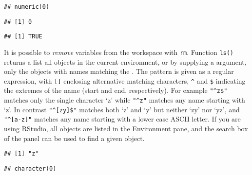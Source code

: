 \documentclass[paper=a4,10pt,div=17,headsepline,BCOR=12mm,twoside,open=right]{scrbook}\usepackage{knitr}
\begin{document}
\begin{knitrout}\footnotesize
{}\color{fgcolor}\begin{kframe}
\begin{alltt}
 \hlkwb{<-} \hlstd{(}\hlstd{)}
\end{alltt}
\begin{verbatim}
## numeric(0)
\end{verbatim}
\begin{alltt}
\end{alltt}
\begin{verbatim}
## [1] 0
\end{verbatim}
\begin{alltt}
\end{alltt}
\begin{verbatim}
## [1] TRUE
\end{verbatim}
\end{kframe}
\end{knitrout}

It is possible to \emph{remove} variables from the workspace with \texttt{rm}. Function \texttt{ls()} returns a list all objects in the current environment, or by supplying a  argument, only the objects with names matching the . The pattern is given as a regular expression, with \verb|[]| enclosing alternative matching characters, \verb|^| and \verb|$| indicating the extremes of the name (start and end, respectively). For example \verb|"^z$"| matches only the single character `z' while \verb|"^z"| matches any name starting with `z'. In contrast \verb|"^[zy]$"| matches both `z' and `y' but neither `zy' nor `yz', and \verb|"^[a-z]"| matches any name starting with a lower case ASCII letter. If you are using RStudio, all objects are listed in the Environment pane, and the search box of the panel can be used to find a given object.

\begin{knitrout}\footnotesize
{}\color{fgcolor}\begin{kframe}
\begin{alltt}
\hlstd{(}\hlstd{=}\hlstd{)}
\end{alltt}
\begin{verbatim}
## [1] "z"
\end{verbatim}
\begin{alltt}
\hlstd{(}\hlstd{=}\hlstd{)}
\end{alltt}
\begin{verbatim}
## character(0)
\end{verbatim}
\end{kframe}
\end{knitrout}
\end{document}
